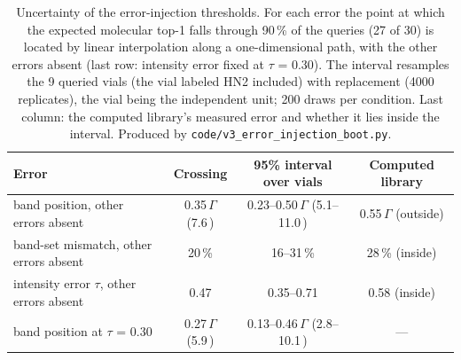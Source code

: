 \begin{table}[htbp]
\centering
\caption{Uncertainty of the error-injection thresholds. For each error the point at which
the expected molecular top-1 falls through 90\,\% of the queries (27 of 30) is located by
linear interpolation along a one-dimensional path, with the other errors absent (last row:
intensity error fixed at $\tau$ = 0.30). The interval resamples the 9 queried vials (the vial labeled HN2 included) with
replacement (4000 replicates), the vial being the independent unit; 200 draws per condition.
Last column: the computed library's measured error and whether it lies inside the interval.
Produced by \texttt{code/v3\_error\_injection\_boot.py}.}
\label{tab:si-errinject-boot}
\small
\begin{tabular}{lccc}
\toprule
Error & Crossing & 95\% interval over vials & Computed library \\
\midrule
band position, other errors absent & 0.35$\,\Gamma$ (7.6\,\wn{}) & 0.23--0.50$\,\Gamma$ (5.1--11.0\,\wn{}) & 0.55$\,\Gamma$ (outside) \\
band-set mismatch, other errors absent & 20\,\% & 16--31\,\% & 28\,\% (inside) \\
intensity error $\tau$, other errors absent & 0.47 & 0.35--0.71 & 0.58 (inside) \\
band position at $\tau$ = 0.30 & 0.27$\,\Gamma$ (5.9\,\wn{}) & 0.13--0.46$\,\Gamma$ (2.8--10.1\,\wn{}) & --- \\
\bottomrule
\end{tabular}
\end{table}
